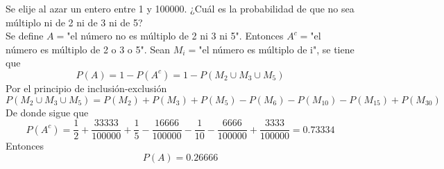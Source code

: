 \item Se elije al azar un entero entre 1 y 100000. ¿Cuál es la probabilidad de que no sea múltiplo ni de 2 ni de 3 ni de 5?\e\\
    Se define $A=$"el número no es múltiplo de 2 ni 3 ni 5". Entonces $A^c=$"el número es múltiplo de 2 o 3 o 5". Sean $M_i=$"el número es múltiplo de i", se tiene que \[P(A)=1-P(A^c)=1-P(M_2\cup M_3\cup M_5)\]
    Por el principio de inclusión-exclusión\[P(M_2\cup M_3\cup M_5)=P(M_2)+P(M_3)+P(M_5)-P(M_6)-P(M_{10})-P(M_{15})+P(M_{30})\]
    De donde sigue que
    \[P(A^c)=\frac{1}{2}+\frac{33333}{100000}+\frac{1}{5}-\frac{16666}{100000}-\frac{1}{10}-\frac{6666}{100000}+\frac{3333}{100000}=0.73334\]
    Entonces\[P(A)=0.26666\]